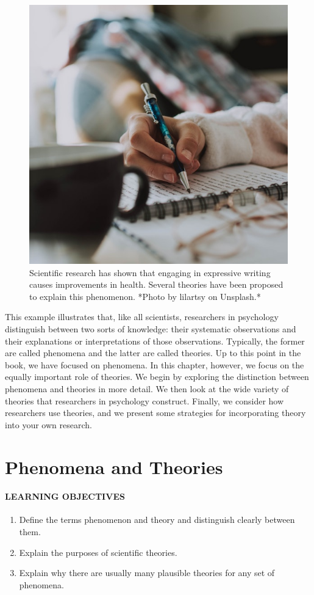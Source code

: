\documentclass[
]{krantz}
\providecommand{\tightlist}{%
  \setlength{\itemsep}{0pt}\setlength{\parskip}{0pt}}
\begin{document}
\begin{figure}

{\centering \includegraphics[width=0.4\linewidth]{images/theory/writing} 

}

\caption{Scientific research has shown that engaging in expressive writing causes improvements in health. Several theories have been proposed to explain this phenomenon. *Photo by lilartsy on Unsplash.*}\label{fig:writing}
\end{figure}

This example illustrates that, like all scientists, researchers in psychology distinguish between two sorts of knowledge: their systematic observations and their explanations or interpretations of those observations. Typically, the former are called phenomena and the latter are called theories. Up to this point in the book, we have focused on phenomena. In this chapter, however, we focus on the equally important role of theories. We begin by exploring the distinction between phenomena and theories in more detail. We then look at the wide variety of theories that researchers in psychology construct. Finally, we consider how researchers use theories, and we present some strategies for incorporating theory into your own research.

\hypertarget{phenomena-and-theories}{%
\section{Phenomena and Theories}\label{phenomena-and-theories}}

\hypertarget{learning-objectives-6}{%
\paragraph*{LEARNING OBJECTIVES}\label{learning-objectives-6}}

\begin{enumerate}
\def\labelenumi{\arabic{enumi}.}
\tightlist
\item
  Define the terms phenomenon and theory and distinguish clearly between them.
\item
  Explain the purposes of scientific theories.
\item
  Explain why there are usually many plausible theories for any set of phenomena.
\end{enumerate}
\end{document}
